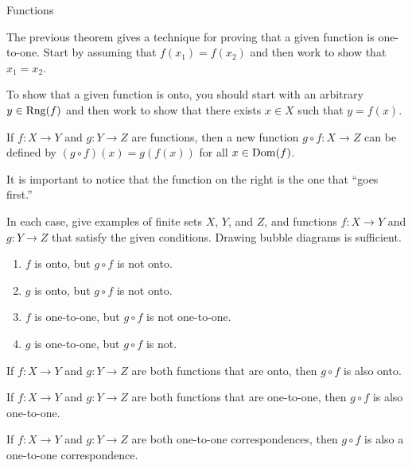 \begin{section}{Functions}
\begin{remark}
The previous theorem gives a technique for proving that a given function is one-to-one.  Start by assuming that $f(x_{1})=f(x_{2})$ and then work to show that $x_{1}=x_{2}$.
\end{remark}

\begin{remark}
To show that a given function is onto, you should start with an arbitrary $y\in \operatorname{Rng}(f)$ and then work to show that there exists $x\in X$ such that $y=f(x)$.
\end{remark}

\begin{definition}
If $f:X\to Y$ and $g:Y\to Z$ are functions, then a new function $g\circ f:X\to Z$ can be defined by $(g\circ f)(x)=g(f(x))$ for all $x\in\operatorname{Dom}(f)$.
\end{definition}

\begin{remark}
It is important to notice that the function on the right is the one that ``goes first.''
\end{remark}

\begin{exercise}
In each case, give examples of finite sets $X$, $Y$, and $Z$, and functions $f:X\to Y$ and $g:Y\to Z$ that satisfy the given conditions.  Drawing bubble diagrams is sufficient.
\begin{enumerate}
\item $f$ is onto, but $g\circ f$ is not onto.
\item $g$ is onto, but $g\circ f$ is not onto.
\item $f$ is one-to-one, but $g\circ f$ is not one-to-one.
\item $g$ is one-to-one, but $g\circ f$ is not.
\end{enumerate}
\end{exercise}

\begin{theorem}
If $f:X\to Y$ and $g:Y\to Z$ are both functions that are onto, then $g\circ f$ is also onto.
\end{theorem}

\begin{theorem}
If $f:X\to Y$ and $g:Y\to Z$ are both functions that are one-to-one, then $g\circ f$ is also one-to-one.
\end{theorem}

\begin{corollary}
If $f:X\to Y$ and $g:Y\to Z$ are both one-to-one correspondences, then $g\circ f$ is also a one-to-one correspondence.
\end{corollary}


\end{section}
